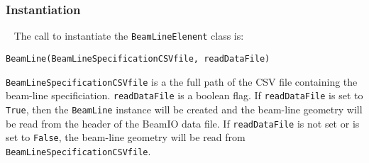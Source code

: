 \subsubsection{Instantiation} ~\newline
\noindent
The call to instantiate the \texttt{BeamLineElenent} class is:
\begin{center}
  \texttt{BeamLine(BeamLineSpecificationCSVfile, readDataFile)}
\end{center}
\texttt{BeamLineSpecificationCSVfile} is a the full path of the CSV
file containing the beam-line specificiation.
\texttt{readDataFile} is a boolean flag.
If \texttt{readDataFile} is set to \texttt{True}, then the \texttt{BeamLine}
instance will be created and the beam-line geometry will be read from
the header of the BeamIO data file.
If \texttt{readDataFile} is not set or is set to \texttt{False}, the
beam-line geometry will be read from \\
\noindent \texttt{BeamLineSpecificationCSVfile}.

